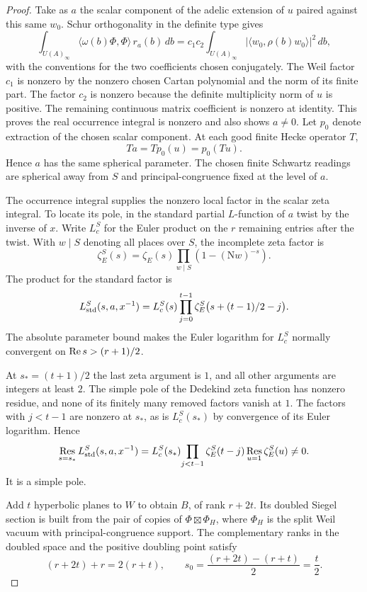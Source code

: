 \begin{proof}
Take as \(a\) the scalar
component of the adelic extension of \(u\) paired against
this same \(w_0\). Schur orthogonality in the definite type gives
\[
 \int_{U(A)_\infty}
    \langle\omega(b)\Phi,\Phi\rangle\,r_a(b)\,db
  = c_1c_2\int_{U(A)_\infty}
       \big|\langle w_0,\rho(b)w_0\rangle\big|^2\,db ,
\]
with the conventions for the two coefficients chosen
conjugately. The Weil factor \(c_1\) is nonzero by the
nonzero chosen Cartan polynomial and the norm of its finite
part. The factor \(c_2\) is nonzero because the definite
multiplicity norm of \(u\) is positive. The remaining
continuous matrix coefficient is nonzero at identity.
This proves the real occurrence integral is nonzero and
also shows \(a\ne0\). Let \(p_0\) denote extraction of the chosen scalar component. At each good finite Hecke operator \(T\),
\[
 T a=T p_0(u)=p_0(Tu).
\]
Hence \(a\) has the same spherical parameter. The chosen finite Schwartz readings
are spherical away from \(S\) and principal-congruence
fixed at the level of \(a\). \label{cor:selected-point-adjoint-2}

The occurrence integral supplies the nonzero local factor in
the scalar zeta integral. To locate its pole, in the standard
partial \(L\)-function of \(a\) twist by
the inverse of \(x\). Write \(L_c^S\) for the Euler product on the \(r\) remaining entries after the twist. With \(w\mid S\) denoting all places over \(S\), the incomplete zeta factor is
\[
 \zeta_E^S(s)=\zeta_E(s)\prod_{w\mid S}(1-(\mathrm Nw)^{-s}).
\]
The product for the standard factor is
\[
 L_{\rm std}^S(s,a,x^{-1}) =
   L_c^S(s)\prod_{j=0}^{t-1}
          \zeta_E^S\big(s+(t-1)/2-j\big).
\]
The absolute parameter bound makes the Euler logarithm for
\(L_c^S\) normally convergent on
\(\operatorname{Re} s>(r+1)/2\).

At \(s_*=(t+1)/2\) the last
zeta argument is \(1\), and all other arguments are integers
at least \(2\). The simple pole of the Dedekind zeta function
has nonzero residue, and none of its finitely many removed
factors vanish at \(1\). The factors with \(j<t-1\) are nonzero at \(s_*\), as is
\(L_c^S(s_*)\) by convergence of its Euler logarithm. Hence
\[
 \operatorname*{Res}_{s=s_*} L_{\rm std}^S(s,a,x^{-1})
  =L_c^S(s_*)\!
      \prod_{j<t-1}\zeta_E^S(t-j)
         \operatorname*{Res}_{u=1}\zeta_E^S(u)\ne0 .
\]
It is a simple pole.

Add \(t\) hyperbolic planes to \(W\) to obtain \(B\), of
rank \(r+2t\). Its doubled Siegel section is built from the
pair of copies of \(\Phi\boxtimes \Phi_H\), where \(\Phi_H\)
is the split Weil vacuum with principal-congruence support.
The complementary ranks in the doubled space and the positive doubling point satisfy
\[
 (r+2t)+r=2(r+t),\qquad s_0=\frac{(r+2t)-(r+t)}2=\frac t2.
\]


\end{proof}
